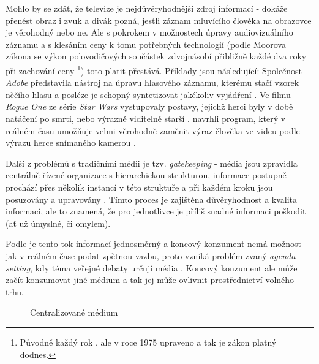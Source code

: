\documentclass[12pt,a4paper]{report}
\begin{document}
Mohlo by se zdát, že televize je nejdůvěryhodnější zdroj informací - dokáže přenést obraz i zvuk a divák pozná, jestli záznam mluvícího člověka na obrazovce je věrohodný nebo ne. Ale s pokrokem v možnostech úpravy audiovizuálního záznamu a s klesáním ceny k tomu potřebných technologií (podle Moorova zákona se výkon polovodičových součástek zdvojnásobí přibližně každé dva roky při zachování ceny \citep{moore04}\footnote{Původně každý rok \citep{moore65}, ale v roce 1975 upraveno a tak je zákon platný dodnes.}) toto platit přestává. Příklady jsou následující: Společnost \textit{Adobe} představila nástroj na úpravu hlasového záznamu, kterému stačí vzorek něčího hlasu a posléze je schopný syntetizovat jakékoliv vyjádření \citep{anthony16}. Ve filmu \textit{Rogue One} ze série \textit{Star Wars} vystupovaly postavy, jejichž herci byly v době natáčení po smrti, nebo výrazně viditelně starší \citep{cooper17}. \citeauthor{thies16} navrhli program, který v reálném času umožňuje velmi věrohodně zaměnit výraz člověka ve videu podle výrazu herce snímaného kamerou \citep{thies16}.

Další z problémů s tradičními médii je tzv. \textit{gatekeeping} - média jsou zpravidla centrálně řízené organizace s hierarchickou strukturou, informace postupně prochází přes několik instancí v této struktuře a při každém kroku jsou posuzovány a upravovány \citep{dragoni13}. Tímto proces je zajištěna důvěryhodnost a kvalita informací, ale to znamená, že pro jednotlivce je příliš snadné informaci poškodit (ať už úmyslné, či omylem).

Podle \citeauthor{dragoni13} je tento tok informací jednosměrný a koncový konzument nemá možnost jak v reálném čase podat zpětnou vazbu, proto vzniká problém zvaný \textit{agenda-setting}, kdy téma veřejné debaty určují média \citep{dragoni13}. Koncový konzument ale může začít konzumovat jiné médium a tak jej může ovlivnit prostřednictví volného trhu.

\begin{figure}
\centering
{}
\caption{Centralizované médium}
\end{figure}
\end{document}
